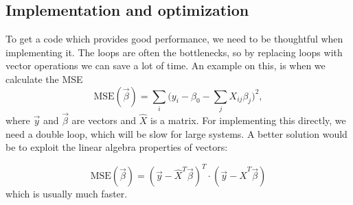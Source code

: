 \subsection{Implementation and optimization} \label{sec:implementation}
To get a code which provides good performance, we need to be thoughtful when implementing it. The loops are often the bottlenecks, so by replacing loops with vector operations we can save a lot of time. An example on this, is when we calculate the MSE
\begin{equation}
\text{MSE}(\vec{\beta})=\sum_i\bigg(y_i-\beta_0-\sum_jX_{ij}\beta_j\bigg)^2,
\end{equation}
where $\vec{y}$ and $\vec{\beta}$ are vectors and $\hat{X}$ is a matrix. For implementing this directly, we need a double loop, which will be slow for large systems. A better solution would be to exploit the linear algebra properties of vectors:

\begin{equation}
\text{MSE}(\vec{\beta})=(\vec{y}-\hat{X}^T\vec{\beta})^T\cdot(\vec{y}-\hat{X}^T\vec{\beta})
\end{equation}
which is usually much faster. 